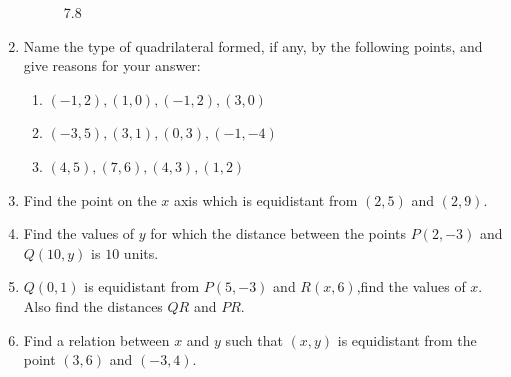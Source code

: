 \documentclass{article}
\theoremstyle{remark}
\begin{document}
\begin{enumerate}
\begin{figure}[ht]
\caption{7.8}
  \label{fig:7.8}
\end{figure}
\item Name the type of quadrilateral formed, if any, by the following points, and give reasons for your answer:
\begin{enumerate}[label=(\roman*)]
\item $(-1,2), (1,0), (-1,2), (3,0)$
\item $(-3,5), (3,1), (0,3), (-1,-4)$
\item $(4,5), (7,6), (4,3), (1,2)$
\end{enumerate}
\item Find the point on the $x$ axis which is equidistant from $(2,5)$ and $(2,9)$. 
\item Find the values of $y$ for which the distance between the points $P(2,-3)$ and $Q(10,y)$ is $10$ units.
\item $Q(0,1)$ is equidistant from $P(5,-3)$ and $R(x,6)$,find the values of $x$. Also find the distances $QR$ and $PR$.
\item Find a relation  between $x$ and $y$ such that $(x,y)$ is equidistant from the point $(3,6)$ and $(-3,4)$.
\end{enumerate}
\end{document}
